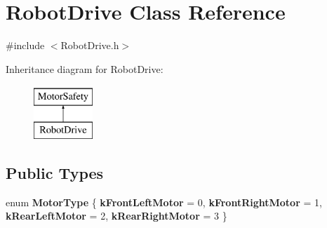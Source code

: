 \hypertarget{classRobotDrive}{\section{\-Robot\-Drive \-Class \-Reference}
\label{classRobotDrive}
}


{\ttfamily \#include $<$\-Robot\-Drive.\-h$>$}

\-Inheritance diagram for \-Robot\-Drive\-:\begin{figure}[H]
\begin{center}
\leavevmode
\includegraphics[height=2.000000cm]{classRobotDrive}
\end{center}
\end{figure}
\subsection*{\-Public \-Types}
\begin{DoxyCompactItemize}
\item 
enum {\bfseries \-Motor\-Type} \{ {\bfseries k\-Front\-Left\-Motor} =  0, 
{\bfseries k\-Front\-Right\-Motor} =  1, 
{\bfseries k\-Rear\-Left\-Motor} =  2, 
{\bfseries k\-Rear\-Right\-Motor} =  3
 \}
\end{DoxyCompactItemize}
